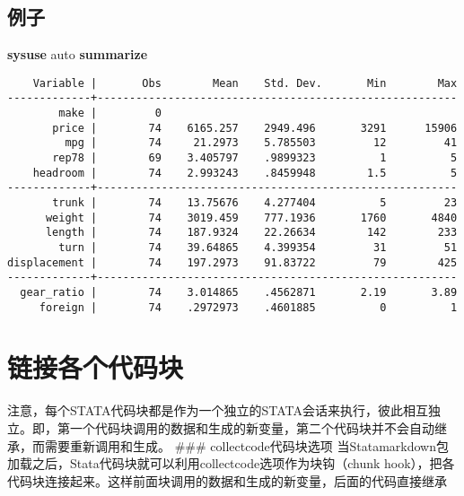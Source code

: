 \documentclass[
]{book}
\newenvironment{Shaded}{\begin{snugshade}}{\end{snugshade}}
\newcommand{\KeywordTok}[1]{\textcolor[rgb]{0.13,0.29,0.53}{\textbf{#1}}}
\newcommand{\NormalTok}[1]{#1}
\begin{document}
\hypertarget{ux4f8bux5b50}{%
\subsection{例子}\label{ux4f8bux5b50}}

\begin{Shaded}
\begin{Highlighting}[]
\KeywordTok{sysuse}\NormalTok{ auto}
\KeywordTok{summarize}
\end{Highlighting}
\end{Shaded}

\begin{verbatim}
    Variable |       Obs        Mean    Std. Dev.       Min        Max
-------------+--------------------------------------------------------
        make |         0
       price |        74    6165.257    2949.496       3291      15906
         mpg |        74     21.2973    5.785503         12         41
       rep78 |        69    3.405797    .9899323          1          5
    headroom |        74    2.993243    .8459948        1.5          5
-------------+--------------------------------------------------------
       trunk |        74    13.75676    4.277404          5         23
      weight |        74    3019.459    777.1936       1760       4840
      length |        74    187.9324    22.26634        142        233
        turn |        74    39.64865    4.399354         31         51
displacement |        74    197.2973    91.83722         79        425
-------------+--------------------------------------------------------
  gear_ratio |        74    3.014865    .4562871       2.19       3.89
     foreign |        74    .2972973    .4601885          0          1
\end{verbatim}

\hypertarget{ux94feux63a5ux5404ux4e2aux4ee3ux7801ux5757}{%
\section{链接各个代码块}\label{ux94feux63a5ux5404ux4e2aux4ee3ux7801ux5757}}

注意，每个STATA代码块都是作为一个独立的STATA会话来执行，彼此相互独立。即，第一个代码块调用的数据和生成的新变量，第二个代码块并不会自动继承，而需要重新调用和生成。
\#\#\# collectcode代码块选项
当Statamarkdown包加载之后，Stata代码块就可以利用collectcode选项作为块钩（chunk hook），把各代码块连接起来。这样前面块调用的数据和生成的新变量，后面的代码直接继承
\end{document}
